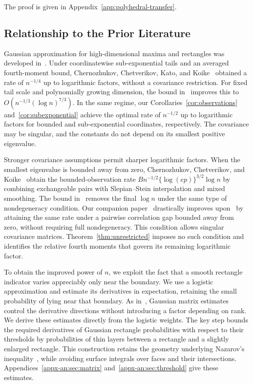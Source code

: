 \documentclass[11pt,letterpaper]{article}
\newenvironment{recovered}{}{}
\theoremstyle{remark}
\begin{document}
\begin{recovered}
The proof is given in Appendix~\ref{app:polyhedral-transfer}.
\end{recovered}


\subsection{Relationship to the Prior Literature}\label{sec:literature}

Gaussian approximation for high-dimensional maxima and rectangles was
developed in~\cite{CCK2013,CCK2017}. Under coordinatewise sub-exponential
tails and an averaged fourth-moment bound, Chernozhukov, Chetverikov,
Kato, and Koike~\cite[Theorem~2.1]{CCKK2022} obtained a rate of
\(n^{-1/4}\) up to logarithmic factors, without a covariance restriction.
For fixed tail scale and polynomially growing dimension, the bound
in~\cite[Theorem~1]{GaoZhang} improves this to
\(O(n^{-1/3}(\log n)^{7/3})\).
In the same regime, our Corollaries~\ref{cor:observations}
and~\ref{cor:subexponential} {achieve the optimal rate of}
\(n^{-1/2}\) up to logarithmic
factors for bounded and sub-exponential coordinates, respectively.
The covariance may be singular, and the constants do not depend on its
smallest positive eigenvalue.

Stronger covariance assumptions permit sharper logarithmic factors.
When the smallest eigenvalue is bounded away from zero,
Chernozhukov, Chetverikov, and Koike~\cite{CCK} obtain the bounded-observation
rate \(Bn^{-1/2}\{\log(ep)\}^{3/2}\log n\) by combining exchangeable
pairs with Slepian--Stein interpolation and mixed smoothing.
The bound in~\cite{AL} removes the final \(\log n\) under the same
type of nondegeneracy condition. {Our companion
paper~\cite{CorrelationGap} drastically improves upon~\cite{AL} by attaining the same
rate under a pairwise correlation gap bounded away from zero, without
requiring full nondegeneracy. This condition allows singular covariance
matrices.}
Theorem~\ref{thm:unrestricted} imposes no such condition and identifies
the relative fourth moments that govern its remaining logarithmic factor.

{To obtain the improved power of \(n\), we exploit the
fact that a smooth rectangle indicator varies appreciably only near the
boundary. We use a logistic approximation and estimate its derivatives
in expectation, retaining the small probability of lying near that
boundary. As in~\cite{GaoZhang}, Gaussian matrix estimates control the
derivative directions without introducing a factor depending on rank.
We derive these estimates directly from the logistic weights. The key
step bounds the required derivatives of Gaussian rectangle probabilities with
respect to their thresholds by probabilities of thin layers between a
rectangle and a slightly enlarged rectangle. This construction retains
the geometry underlying Nazarov's inequality~\cite{Nazarov2003,CCK17N},
while avoiding surface integrals over faces and their intersections.
Appendices~\ref{appx-an:sec:matrix}
and~\ref{appx-an:sec:threshold} give these estimates.}
\end{document}
